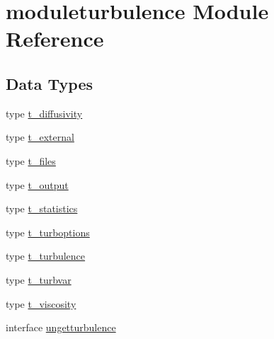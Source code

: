 \hypertarget{namespacemoduleturbulence}{}\section{moduleturbulence Module Reference}
\label{namespacemoduleturbulence}
\subsection*{Data Types}
\begin{DoxyCompactItemize}
\item 
type \mbox{\hyperlink{structmoduleturbulence_1_1t__diffusivity}{t\+\_\+diffusivity}}
\item 
type \mbox{\hyperlink{structmoduleturbulence_1_1t__external}{t\+\_\+external}}
\item 
type \mbox{\hyperlink{structmoduleturbulence_1_1t__files}{t\+\_\+files}}
\item 
type \mbox{\hyperlink{structmoduleturbulence_1_1t__output}{t\+\_\+output}}
\item 
type \mbox{\hyperlink{structmoduleturbulence_1_1t__statistics}{t\+\_\+statistics}}
\item 
type \mbox{\hyperlink{structmoduleturbulence_1_1t__turboptions}{t\+\_\+turboptions}}
\item 
type \mbox{\hyperlink{structmoduleturbulence_1_1t__turbulence}{t\+\_\+turbulence}}
\item 
type \mbox{\hyperlink{structmoduleturbulence_1_1t__turbvar}{t\+\_\+turbvar}}
\item 
type \mbox{\hyperlink{structmoduleturbulence_1_1t__viscosity}{t\+\_\+viscosity}}
\item 
interface \mbox{\hyperlink{interfacemoduleturbulence_1_1ungetturbulence}{ungetturbulence}}
\end{DoxyCompactItemize}
